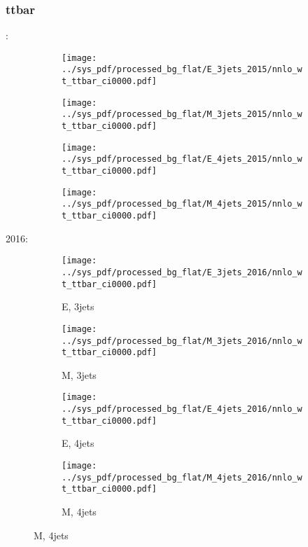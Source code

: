 \documentclass{beamer}
\begin{document}
\begin{frame}
\frametitle{ttbar}
\fontsize{5}{1}:
\begin{figure}
\centering
\begin{subfigure}[b]{0.24\textwidth}
\texttt{[image: ../sys\_pdf/processed\_bg\_flat/E\_3jets\_2015/nnlo\_wt\_ttbar\_ci0000.pdf]}
\end{subfigure}
\begin{subfigure}[b]{0.24\textwidth}
\texttt{[image: ../sys\_pdf/processed\_bg\_flat/M\_3jets\_2015/nnlo\_wt\_ttbar\_ci0000.pdf]}
\end{subfigure}
\begin{subfigure}[b]{0.24\textwidth}
\texttt{[image: ../sys\_pdf/processed\_bg\_flat/E\_4jets\_2015/nnlo\_wt\_ttbar\_ci0000.pdf]}
\end{subfigure}
\begin{subfigure}[b]{0.24\textwidth}
\texttt{[image: ../sys\_pdf/processed\_bg\_flat/M\_4jets\_2015/nnlo\_wt\_ttbar\_ci0000.pdf]}
\end{subfigure}
\end{figure}
2016:
\begin{figure}
\centering
\begin{subfigure}[b]{0.24\textwidth}
\texttt{[image: ../sys\_pdf/processed\_bg\_flat/E\_3jets\_2016/nnlo\_wt\_ttbar\_ci0000.pdf]}
\captionsetup{font=tiny}
\caption{E, 3jets}
\end{subfigure}
\begin{subfigure}[b]{0.24\textwidth}
\texttt{[image: ../sys\_pdf/processed\_bg\_flat/M\_3jets\_2016/nnlo\_wt\_ttbar\_ci0000.pdf]}
\captionsetup{font=tiny}
\caption{M, 3jets}
\end{subfigure}
\begin{subfigure}[b]{0.24\textwidth}
\texttt{[image: ../sys\_pdf/processed\_bg\_flat/E\_4jets\_2016/nnlo\_wt\_ttbar\_ci0000.pdf]}
\captionsetup{font=tiny}
\caption{E, 4jets}
\end{subfigure}
\begin{subfigure}[b]{0.24\textwidth}
\texttt{[image: ../sys\_pdf/processed\_bg\_flat/M\_4jets\_2016/nnlo\_wt\_ttbar\_ci0000.pdf]}
\captionsetup{font=tiny}
\caption{M, 4jets}
\end{subfigure}
\end{figure}
\end{frame}
\end{document}
